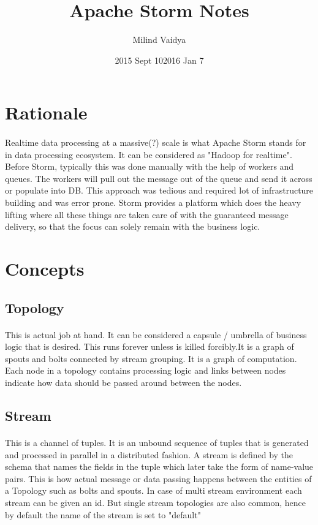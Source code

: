 \documentclass{article}
\title{Apache Storm Notes}
\date{2015 Sept 10}
\date{2016 Jan 7}
\author{Milind Vaidya}
\begin{document}
    \maketitle
    \newpage
    \section{Rationale}
    \paragraph{}
    Realtime data processing at a massive(?) scale is what Apache Storm stands
    for in data processing ecosystem. It can be considered as "Hadoop for
    realtime". Before Storm, typically this was done manually with the help
    of workers and queues. The workers will pull out the message out of the
    queue and send it across or populate into DB. This approach was tedious
    and required lot of infrastructure building and was error prone. Storm
    provides a platform which does the heavy lifting where all these things
    are taken care of with the guaranteed message delivery, so that the
    focus can solely remain with the business logic. \section{Concepts}
    \subsection{Topology} \paragraph{} This is actual job at hand. It can be
    considered a capsule /  umbrella of business logic that is desired. This
    runs forever unless is killed forcibly.It is a graph of spouts and bolts
    connected by stream grouping. It is a graph of computation. Each node in
    a topology contains processing logic and links between nodes indicate
    how data should be passed around between the nodes.

    \subsection{Stream}
    \paragraph{}
    This is a channel of tuples. It is an unbound sequence of tuples that is
    generated and processed in parallel in a distributed fashion. A stream is
    defined by the schema that names the fields in the tuple which later take
    the form of name-value pairs. This is how actual message or data passing
    happens between the entities of a Topology such as bolts and spouts. In case
    of multi stream environment each stream can be given an id. But single
    stream topologies are also common, hence by default the name of the stream
    is set to "default"
\end{document}
